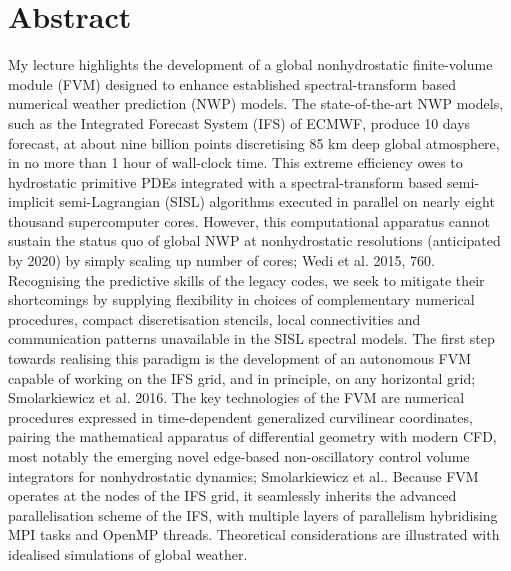 	\section*{Abstract}
	My lecture highlights the development of a global nonhydrostatic finite-volume module (FVM) designed to enhance established spectral-transform based numerical weather prediction (NWP) models. The state-of-the-art NWP models, such as the Integrated Forecast System (IFS) of ECMWF, produce 10 days forecast, at about nine billion points discretising 85 km deep global atmosphere, in no more than 1 hour of wall-clock time. This extreme efficiency owes to hydrostatic primitive PDEs integrated with a spectral-transform based semi-implicit semi-Lagrangian (SISL) algorithms executed in parallel on nearly eight thousand supercomputer cores. However, this computational apparatus cannot sustain the status quo of global NWP at nonhydrostatic resolutions (anticipated by 2020) by simply scaling up number of cores; Wedi et al. 2015, 760. Recognising the predictive skills of the legacy codes, we seek to mitigate their shortcomings by supplying flexibility in choices of complementary numerical procedures, compact discretisation stencils, local connectivities and communication patterns unavailable in the SISL spectral models. The first step towards realising this paradigm is the development of an autonomous FVM capable of working on the IFS grid, and in principle, on any horizontal grid; Smolarkiewicz et al. 2016. The key technologies of the FVM are numerical procedures expressed in time-dependent generalized curvilinear coordinates, pairing the mathematical apparatus of differential geometry with modern CFD, most notably the emerging novel edge-based non-oscillatory control volume integrators for nonhydrostatic dynamics; Smolarkiewicz et al.. Because FVM operates at the nodes of the IFS grid, it seamlessly inherits the advanced parallelisation scheme of the IFS, with multiple layers of parallelism hybridising MPI tasks and OpenMP threads. Theoretical considerations are illustrated with idealised simulations of global weather.
	
         
    \vspace{.5cm}
    \newpage
    
